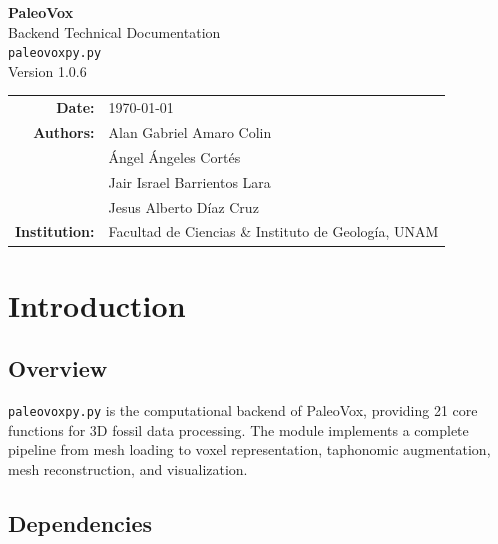 \documentclass[12pt,a4paper]{article}
\begin{document}
\begin{titlepage}
\centering
\vspace*{3cm}

{\Huge\bfseries PaleoVox}\\[0.5cm]
{\Large Backend Technical Documentation}\\[0.5cm]
{\Large \texttt{paleovoxpy.py}}\\[1.5cm]

{\large Version 1.0.6}\\[2cm]

\begin{tabular}{rl}
\textbf{Date:} & \today \\
\textbf{Authors:} & Alan Gabriel Amaro Colin \\
                 & Ángel Ángeles Cortés \\
                 & Jair Israel Barrientos Lara \\
                 & Jesus Alberto Díaz Cruz \\
\textbf{Institution:} & Facultad de Ciencias \& Instituto de Geología, UNAM \\
\end{tabular}

\vfill
\end{titlepage}

\tableofcontents
\newpage

\section{Introduction}

\subsection{Overview}

\texttt{paleovoxpy.py} is the computational backend of PaleoVox, providing 21 core functions for 3D fossil data processing. The module implements a complete pipeline from mesh loading to voxel representation, taphonomic augmentation, mesh reconstruction, and visualization.

\subsection{Dependencies}
\end{document}
